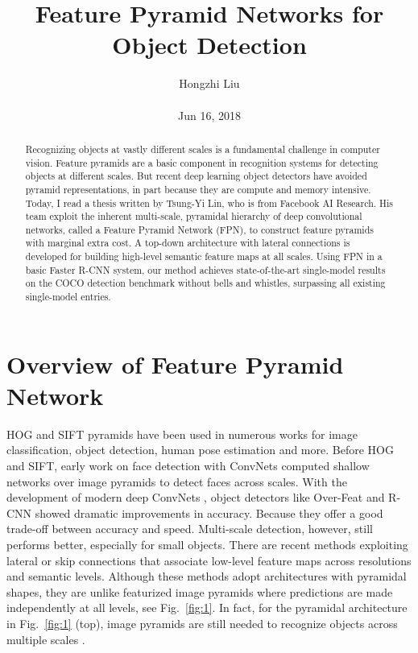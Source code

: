 \documentclass[10pt,twocolumn,letterpaper]{article}
\title{Feature Pyramid Networks for Object Detection }
\author{Hongzhi Liu\\\\
Jun 16, 2018}
\begin{document}
\maketitle
\begin{abstract}
	Recognizing objects at vastly different scales is a fundamental challenge in computer vision. Feature pyramids are a basic component in recognition systems for detecting objects at different scales. But recent deep learning object detectors have avoided pyramid representations, in part because they are compute and memory intensive. Today, I read a thesis written by Tsung-Yi Lin, who is from Facebook AI Research. His team exploit the inherent multi-scale, pyramidal hierarchy of deep convolutional networks, called a Feature Pyramid Network (FPN), to construct feature pyramids with marginal extra cost. A top-down architecture with lateral connections is developed for building high-level semantic feature maps at all scales. Using FPN in a basic Faster R-CNN system, our method achieves state-of-the-art single-model results on the COCO detection benchmark without bells and whistles, surpassing all existing single-model entries.
\end{abstract}
\section{Overview of Feature Pyramid Network}

HOG and SIFT pyramids have been used in numerous works for image classification, object detection, human pose estimation and more. Before HOG and SIFT, early work on face detection with ConvNets \cite{Vaillant1994Original} computed shallow networks over image pyramids to detect faces across scales. With the development of modern deep ConvNets \cite{Krizhevsky2012ImageNet}, object detectors like Over-Feat \cite{Sermanet2013OverFeat} and R-CNN \cite{girshick2014rich} showed dramatic improvements in accuracy. Because they offer a good trade-off between accuracy and speed. Multi-scale detection, however, still performs better, especially for small objects. There are recent methods exploiting lateral or skip connections that associate low-level feature maps across resolutions and semantic levels. Although these methods adopt architectures with pyramidal shapes, they are unlike featurized image pyramids \cite{dalal2005histograms} where predictions are made independently at all levels, see Fig.~\ref{fig:1}. In fact, for the pyramidal architecture in Fig.~\ref{fig:1} (top), image pyramids are still needed to recognize objects across multiple scales \cite{pinheiro2016learning}.
\end{document}
